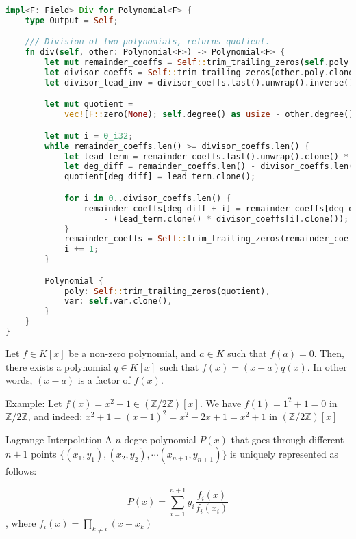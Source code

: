 \documentclass{article}
\begin{document}
\begin{lstlisting}[language=Rust, caption=Division of polynomials]
impl<F: Field> Div for Polynomial<F> {
    type Output = Self;

    /// Division of two polynomials, returns quotient.
    fn div(self, other: Polynomial<F>) -> Polynomial<F> {
        let mut remainder_coeffs = Self::trim_trailing_zeros(self.poly.clone());
        let divisor_coeffs = Self::trim_trailing_zeros(other.poly.clone());
        let divisor_lead_inv = divisor_coeffs.last().unwrap().inverse();

        let mut quotient =
            vec![F::zero(None); self.degree() as usize - other.degree() as usize + 1];

        let mut i = 0_i32;
        while remainder_coeffs.len() >= divisor_coeffs.len() {
            let lead_term = remainder_coeffs.last().unwrap().clone() * divisor_lead_inv.clone();
            let deg_diff = remainder_coeffs.len() - divisor_coeffs.len();
            quotient[deg_diff] = lead_term.clone();

            for i in 0..divisor_coeffs.len() {
                remainder_coeffs[deg_diff + i] = remainder_coeffs[deg_diff + i].clone()
                    - (lead_term.clone() * divisor_coeffs[i].clone());
            }
            remainder_coeffs = Self::trim_trailing_zeros(remainder_coeffs);
            i += 1;
        }

        Polynomial {
            poly: Self::trim_trailing_zeros(quotient),
            var: self.var.clone(),
        }
    }
}
\end{lstlisting}

\begin{corollary}{}{}
    Let $f \in K[x]$ be a non-zero polynomial, and $a \in K$ such that $f(a) = 0$. Then, there exists a polynomial $q \in K[x]$ such that $f(x) = (x - a)q(x)$. In other words, $(x - a)$ is a factor of $f(x)$.
\end{corollary}


Example: Let $f(x) = x^2 + 1 \in (\mathbb{Z}/2\mathbb{Z})[x]$. We have $f(1) = 1^2 + 1 = 0$ in $\mathbb{Z}/2\mathbb{Z}$, and indeed: $x^2 + 1 = (x - 1)^2 = x^2 - 2x + 1 = x^2 + 1$ in $(\mathbb{Z}/2\mathbb{Z})[x]$

\begin{theorem}{Lagrange Interpolation}{}
    A $n$-degre polynomial $P(x)$ that goes through different $n + 1$ points $\{(x_1, y_1), (x_2, y_2), \cdots (x_{n + 1}, y_{n + 1})\}$ is uniquely represented as follows:

    \begin{equation}
        P(x) = \sum^{n+1}_{i=1} y_i \frac{f_i(x)}{f_i(x_i)}
    \end{equation}, where $f_i(x) = \prod_{k \neq i} (x - x_k)$
\end{theorem}
\end{document}
